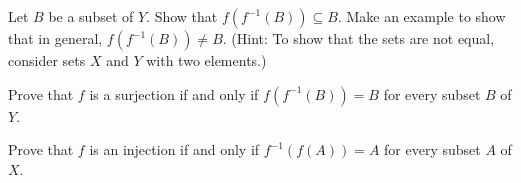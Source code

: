 \item Let $B$ be a subset of $Y$. Show that $f(f^{-1}(B)) \subseteq B$. Make an example to show that in general, $f(f^{-1}(B)) \neq B$. (Hint: To show that the sets are not equal, consider sets $X$ and $Y$ with two elements.) 

\item  Prove that $f$ is a surjection if and only if $f(f^{-1}(B)) = B$ for every subset $B$ of $Y$.

\item Prove that $f$ is an injection if and only if $f^{-1}(f(A)) = A$ for every subset $A$ of $X$.

\ea

\begin{comment}

\ExerciseSolution 

\ba

\item Let $A$ be a subset of $X$. Let $a \in A$. Then $f(a) \in f(A)$. This means that $a \in f^{-1}(f(A))$.  Thus,  $A \subseteq f^{-1}(f(A))$. 

To demonstrate that we do not always obtain an equality, let $X = \{x_1, x_2\}$ and $Y = \{y_1, y_2\}$, and let $f:X \to Y$ be defined by $f(x) = y_1$ for every $x \in X$. Then
\[f^{-1}(f(\{x_1\})) = f^{-1}(\{y_1\}) = \{x_1, x_2\} \neq \{x_1\}.\]

\item Let $B$ be a subset of $Y$ and let $b \in f(f^{-1}(B))$. Then there is an element $x \in f^{-1}(B)$ such that $b = f(x)$. But since $x \in f^{-1}(B)$, we have that $f(x) \in B$. Thus, $b \in B$ and $f(f^{-1}(B)) \subseteq B$.

To demonstrate that we do not always obtain an equality, let $X = \{x_1, x_2\}$ and $Y = \{y_1, y_2\}$, and let $f:X \to Y$ be defined by $f(x) = y_1$ for every $x \in X$. Then
\[f(f^{-1}(Y)) = f(X) = \{y_1\} \neq Y.\]

\item For one direction, assume that $f$ is a surjection. Let $B$ be a subset of $Y$. We will show that $f(f^{-1}(B)) = B$. From part (b) we know that $f(f^{-1}(B)) \subseteq B$, so we only need to show that $B \subseteq f(f^{-1}(B))$. Let $b \in B$. Since $f$ is a surjection, there is an element $x \in X$ such that $f(x) = b$. The fact that $f(x) = b \in B$ means that $x \in f^{-1}(B)$. Thus, $b = f(x) \in f(f^{-1}(B))$. We conclude that  $f(f^{-1}(B)) = B$.

Now we assume that $f(f^{-1}(B)) = B$ for every subset $B$ of $Y$ and show that $f$ is a surjection. Let $y \in Y$. Since $f(f^{-1}(Y)) = Y$, we have that there exists $x \in f^{-1}(Y)$ such that $f(x) = y$. Thus, $f$ is a surjection. 


\end{comment}
